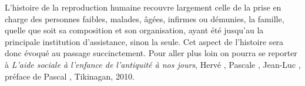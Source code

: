 L'histoire de la reproduction humaine recouvre largement celle
de la prise en charge des personnes faibles, malades, âgées, infirmes ou
démunies, la famille, quelle que soit sa composition et son organisation, ayant été jusqu'au  la principale institution
d'assistance, sinon la seule. Cet aspect de l'histoire sera donc évoqué
au passage succinctement. Pour aller plus loin on
pourra se reporter à \emph{L'aide sociale à l'enfance de l'antiquité à
nos jours}, Hervé , Pascale , Jean-Luc ,
préface de Pascal , Tikinagan, 2010.



